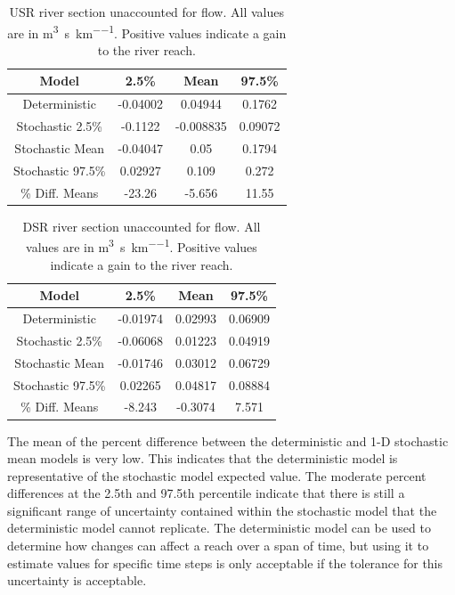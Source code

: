 \begin{linenumbers}
\begin{table}[htbp]
\centering
\caption[USR river section unaccounted for flow.]{USR river section unaccounted for flow.  All values are in \si{\cubic\meter\per\second\per\kilo\meter}.  Positive values indicate a gain to the river reach.}
\label{tab:USRFlow}
\begin{tabular}{c|ccc}
	\toprule
	Model& 2.5\% & Mean & 97.5\% \\
	\midrule
	\midrule
	Deterministic&		-0.04002&	0.04944&	0.1762\\
	\midrule			                               
	Stochastic 2.5\%&	-0.1122&	-0.008835&	0.09072\\
	Stochastic Mean&	-0.04047&	0.05&	0.1794\\     
	Stochastic 97.5\%&	0.02927&	0.109&	0.272\\      
	\midrule                                           
	\% Diff. Means &	-23.26&	-5.656&	11.55 \\
	\bottomrule
\end{tabular}
\end{table}

\begin{table}[htbp]
\centering
\caption[DSR river section unaccounted for flow.]{DSR river section unaccounted for flow.  All values are in \si{\cubic\meter\per\second\per\kilo\meter}.  Positive values indicate a gain to the river reach.}
\label{tab:DSRFlow}
\begin{tabular}{c|ccc}
	\toprule
	Model& 2.5\% & Mean & 97.5\% \\
	\midrule
	\midrule
	Deterministic&		-0.01974&	0.02993&	0.06909\\
	\midrule			                                
	Stochastic 2.5\%&	-0.06068&	0.01223&	0.04919\\
	Stochastic Mean&	-0.01746&	0.03012&	0.06729\\
	Stochastic 97.5\%&	0.02265&	0.04817&	0.08884\\
	\midrule                                            
	\% Diff. Means &	-8.243&	-0.3074&	7.571\\
	\bottomrule
\end{tabular}
\end{table}

The mean of the percent difference between the deterministic and 1-D stochastic mean models is very low.  This indicates that the deterministic model is representative of the stochastic model expected value.  The moderate percent differences at the 2.5th and 97.5th percentile indicate that there is still a significant range of uncertainty contained within the stochastic model that the deterministic model cannot replicate.  The deterministic model can be used to determine how changes can affect a reach over a span of time, but using it to estimate values for specific time steps is only acceptable if the tolerance for this uncertainty is acceptable.


\end{linenumbers}
